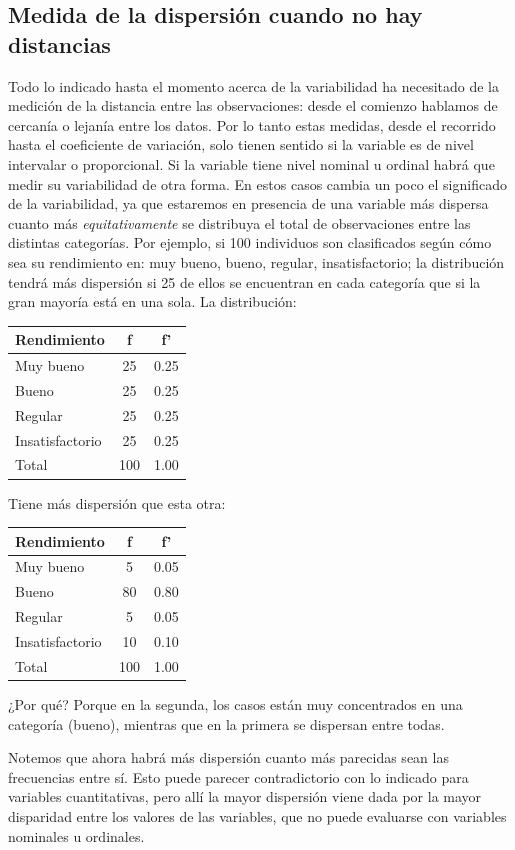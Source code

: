 \documentclass[]{book}
\begin{document}
\hypertarget{medida-de-la-dispersion-cuando-no-hay-distancias}{%
\subsection{Medida de la dispersión cuando no hay distancias}\label{medida-de-la-dispersion-cuando-no-hay-distancias}}

Todo lo indicado hasta el momento acerca de la variabilidad ha
necesitado de la medición de la distancia entre las observaciones: desde el comienzo hablamos de cercanía o lejanía entre los datos. Por lo tanto
estas medidas, desde el recorrido hasta el coeficiente de variación,
solo tienen sentido si la variable es de nivel intervalar o
proporcional. Si la variable tiene nivel nominal u ordinal habrá que
medir su variabilidad de otra forma. En estos casos cambia un poco el
significado de la variabilidad, ya que estaremos en presencia de una
variable más dispersa cuanto más \emph{equitativamente} se distribuya el
total de observaciones entre las distintas categorías. Por ejemplo, si 100 individuos son clasificados según cómo sea su rendimiento en: muy bueno, bueno, regular, insatisfactorio; la distribución tendrá más
dispersión si 25 de ellos se encuentran en cada categoría que si la gran
mayoría está en una sola. La distribución:

\begin{longtable}[]{@{}lcc@{}}
\toprule
Rendimiento & f & f'\tabularnewline
\midrule
\endhead
Muy bueno & 25 & 0.25\tabularnewline
Bueno & 25 & 0.25\tabularnewline
Regular & 25 & 0.25\tabularnewline
Insatisfactorio & 25 & 0.25\tabularnewline
Total & 100 & 1.00\tabularnewline
\bottomrule
\end{longtable}

Tiene más dispersión que esta otra:

\begin{longtable}[]{@{}lcc@{}}
\toprule
Rendimiento & f & f'\tabularnewline
\midrule
\endhead
Muy bueno & 5 & 0.05\tabularnewline
Bueno & 80 & 0.80\tabularnewline
Regular & 5 & 0.05\tabularnewline
Insatisfactorio & 10 & 0.10\tabularnewline
Total & 100 & 1.00\tabularnewline
\bottomrule
\end{longtable}

¿Por qué? Porque en la segunda, los casos están muy concentrados en una categoría (bueno), mientras que en la primera se dispersan entre todas.

Notemos que ahora habrá más dispersión cuanto más parecidas sean las
frecuencias entre sí. Esto puede parecer contradictorio con lo indicado
para variables cuantitativas, pero allí la mayor dispersión viene dada
por la mayor disparidad entre los valores de las variables, que no puede
evaluarse con variables nominales u ordinales.
\end{document}

